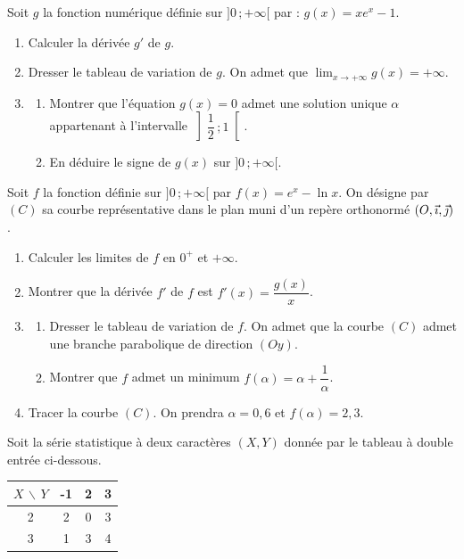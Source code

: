 \documentclass[11pt]{article}
\begin{document}
Soit $g$ la fonction numérique définie sur $]0\,;+\infty[$ par : $g(x) = xe^x - 1$.

\begin{enumerate}
  \item Calculer la dérivée $g'$ de $g$.
  \item Dresser le tableau de variation de $g$. On admet que $\displaystyle\lim_{x\to+\infty} g(x) = +\infty$.
  \item \begin{enumerate}[label=\alph*.]
    \item Montrer que l'équation $g(x) = 0$ admet une solution unique $\alpha$ appartenant à l'intervalle $\left]\dfrac{1}{2}\,;1\right[$.
    \item En déduire le signe de $g(x)$ sur $]0\,;+\infty[$.
  \end{enumerate}
\end{enumerate}

Soit $f$ la fonction définie sur $]0\,;+\infty[$ par $f(x) = e^x - \ln x$. On désigne par $(C)$ sa courbe représentative dans le plan muni d'un repère orthonormé $(O,\vec{\imath},\vec{\jmath})$.

\begin{enumerate}[start=4]
  \item Calculer les limites de $f$ en $0^+$ et $+\infty$.
  \item Montrer que la dérivée $f'$ de $f$ est $f'(x) = \dfrac{g(x)}{x}$.
  \item \begin{enumerate}[label=\alph*.]
    \item Dresser le tableau de variation de $f$. On admet que la courbe $(C)$ admet une branche parabolique de direction $(Oy)$.
    \item Montrer que $f$ admet un minimum $f(\alpha) = \alpha + \dfrac{1}{\alpha}$.
  \end{enumerate}
  \item Tracer la courbe $(C)$. On prendra $\alpha = 0{,}6$ et $f(\alpha) = 2{,}3$.
\end{enumerate}


Soit la série statistique à deux caractères $(X, Y)$ donnée par le tableau à double entrée ci-dessous.

\begin{center}
\renewcommand{\arraystretch}{1.3}
\begin{tabular}{|c|c|c|c|}
\hline
$X\,\backslash\,Y$ & -1 & 2 & 3 \\
\hline
2 & 2 & 0 & 3 \\
\hline
3 & 1 & 3 & 4 \\
\hline
\end{tabular}
\end{center}
\end{document}
